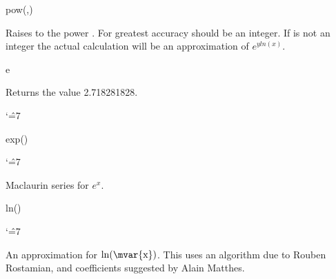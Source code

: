 \begin{math-function}{pow(,)}
\mathcommand

 Raises  to the power . For greatest accuracy 
  should be an integer. If  is not an integer
 the actual calculation will be an approximation of $e^{yln(x)}$.

\begin{codeexample}[]
 \pgfmathresult
\end{codeexample}

\end{math-function}


\begin{math-function}{e}
\mathcommand

  Returns the value 2.718281828.
{
\catcode`\^=7

\begin{codeexample}[]
 \pgfmathresult
\end{codeexample}

}
\end{math-function}

\begin{math-function}{exp()}
\mathcommand

{
\catcode`\^=7

	Maclaurin series for $e^x$. 
}	
\begin{codeexample}[]
 \pgfmathresult
\end{codeexample}

\begin{codeexample}[]
 \pgfmathresult
\end{codeexample}

\end{math-function}


\begin{math-function}{ln()}
\mathcommand

{
\catcode`\^=7

	An approximation for $\ln(\textrm{\mvar{x}})$. 
	This uses an algorithm due to Rouben Rostamian, and coefficients
	suggested by Alain Matthes.
}	
\begin{codeexample}[]
 \pgfmathresult
\end{codeexample}

\begin{codeexample}[]
 \pgfmathresult
\end{codeexample}

\end{math-function}

